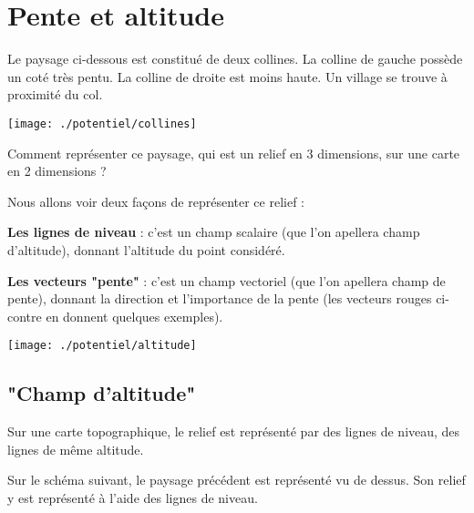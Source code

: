 
\section{Pente et altitude}
%
Le paysage ci-dessous est constitué de deux collines. La colline de gauche possède un coté très pentu. La colline de droite est moins haute. Un village se trouve à proximité du col.

\vfill
\begin{center}
\texttt{[image: ./potentiel/collines]}
\end{center}

\vfill
Comment représenter ce paysage, qui est un relief en 3 dimensions, sur une carte en 2 dimensions ?

Nous allons voir deux façons de représenter ce relief : 

\vfill
\begin{minipage}[c]{.45\linewidth}
{\bf Les lignes de niveau} : c'est un champ scalaire (que l'on apellera champ d'altitude), donnant l'altitude du point considéré.

{\bf Les vecteurs "pente"} : c'est un champ vectoriel (que l'on apellera champ de pente), donnant la direction et l'importance de la pente (les vecteurs rouges ci-contre en donnent quelques exemples).
\end{minipage}
\hfill
\begin{minipage}[c]{.45\linewidth}
\begin{center}
\texttt{[image: ./potentiel/altitude]}
\end{center}
\end{minipage}

\vfill
\newpage

\subsection{"Champ d'altitude"}

Sur une carte topographique, le relief est représenté par des lignes de niveau, des lignes de même altitude.

Sur le schéma suivant, le paysage précédent est représenté vu de dessus. Son relief y est représenté à l'aide des lignes de niveau.

